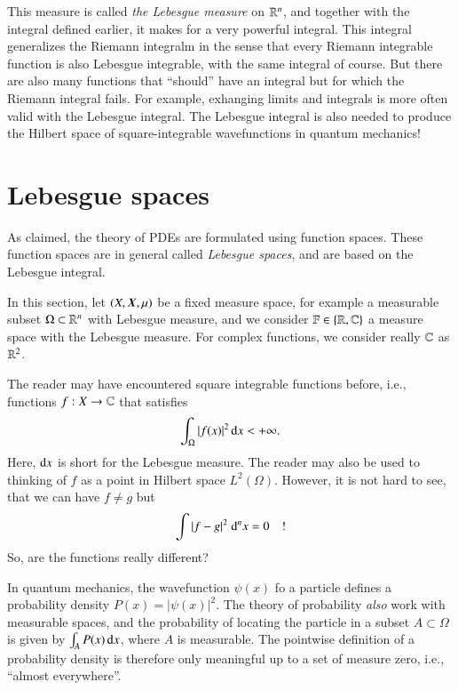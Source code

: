This measure is called \emph{the Lebesgue measure} on $\mathbb{R}^n$, and together with the integral defined earlier, it makes for a very powerful integral. This integral generalizes the Riemann integralm in the sense that every Riemann integrable function is also Lebesgue integrable, with the same integral of course. But there are also many functions that ``should'' have an integral but for which the Riemann integral fails. For example, exhanging limits and integrals is more often valid with the Lebesgue integral. The Lebesgue integral is also needed to produce the Hilbert space of square-integrable wavefunctions in quantum mechanics!


\section{Lebesgue spaces}

As claimed, the theory of PDEs are formulated using function spaces. These function spaces are in general called \emph{Lebesgue spaces}, and are based on the Lebesgue integral.

In this section, let $(X,\boldsymbol{X},\mu)$ be a fixed measure space, for example a measurable subset $\Omega\subset \mathbb{R}^n$ with Lebesgue measure, and we consider $\mathbb{F} \in \{\mathbb{R}, \mathbb{C}\}$ a measure space with the Lebesgue measure. For complex functions, we consider really $\mathbb{C}$ as $\mathbb{R}^2$.

The reader may have encountered square integrable functions before, i.e., functions $f : X \to \mathbb{C}$ that satisfies
\begin{equation}
    \int_\Omega |f(x)|^2 \, \mathrm{d} x < +\infty.
\end{equation}
Here, $\mathrm{d} x$ is short for the Lebesgue measure.
The reader may also be used to thinking of $f$ as a point in Hilbert space $L^2(\Omega)$. However, it is not hard to see, that we can have $f \neq g$ but 
\begin{equation}
\int |f-g|^2 \; \mathrm{d}^n x = 0 \quad !
\end{equation}
So, are the functions really different?

In quantum mechanics, the wavefunction $\psi(x)$ fo a particle defines a probability density $P(x) = |\psi(x)|^2$. The theory of probability \emph{also} work with measurable spaces, and the probability of locating the particle in a subset $A \subset \Omega$ is given by $\int_A P(x) \,\mathrm{d} x$, where $A$ is measurable. The pointwise definition of a probability density is therefore only meaningful up to a set of measure zero, i.e., ``almost everywhere''.


